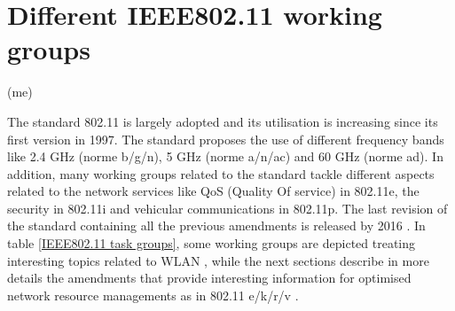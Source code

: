 \documentclass[journal,transmag]{IEEEtran}
\begin{document}
\section{Different IEEE802.11 working groups} (me)
\label{802.11 principe}

The standard 802.11 is largely adopted and its utilisation is increasing since its first version in 1997. The standard proposes the use of different frequency bands like 2.4 GHz (norme b/g/n), 5 GHz (norme a/n/ac) and 60 GHz (norme ad). In addition, many working groups related to the standard tackle different aspects related to the network services like QoS (Quality Of service) in 802.11e, the security in 802.11i and vehicular communications in 802.11p. The last revision  of the standard containing all the previous amendments is released by 2016 \cite{16standard_802.11}. In table \ref {IEEE802.11 task groups}, some working groups are depicted treating interesting topics related to WLAN \cite{17CISCO_mobility_guide}, while the next sections describe in more details the amendments that provide interesting information for optimised network resource managements as in 802.11 e/k/r/v \cite{16IEEE802.11k_r_v}.  
\end{document}
